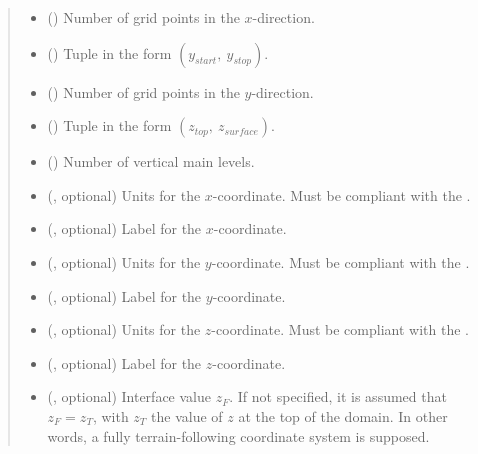\documentclass[letterpaper,10pt,english]{sphinxmanual}
\begin{document}
\begin{fulllineitems}
\begin{fulllineitems}
\begin{quote}
\begin{description}
\begin{itemize}
\item {} 
 () \textendash{} Number of grid points in the \(x\)-direction.

\item {} 
 () \textendash{} Tuple in the form \((y_{start}, ~ y_{stop})\).

\item {} 
 () \textendash{} Number of grid points in the \(y\)-direction.

\item {} 
 () \textendash{} Tuple in the form \((z_{top}, ~ z_{surface})\).

\item {} 
 () \textendash{} Number of vertical main levels.

\item {} 
 (, optional) \textendash{} 
Units for the \(x\)-coordinate. Must be compliant with the .


\item {} 
 (, optional) \textendash{} Label for the \(x\)-coordinate.

\item {} 
 (, optional) \textendash{} 
Units for the \(y\)-coordinate. Must be compliant with the .


\item {} 
 (, optional) \textendash{} Label for the \(y\)-coordinate.

\item {} 
 (, optional) \textendash{} 
Units for the \(z\)-coordinate. Must be compliant with the .


\item {} 
 (, optional) \textendash{} Label for the \(z\)-coordinate.

\item {} 
 (, optional) \textendash{} Interface value \(z_F\). If not specified, it is assumed that \(z_F = z_T\), with \(z_T\)
the value of \(z\) at the top of the domain. In other words, a fully terrain-following coordinate
system is supposed.


\end{itemize}
\end{description}
\end{quote}
\end{fulllineitems}
\end{fulllineitems}
\end{document}
